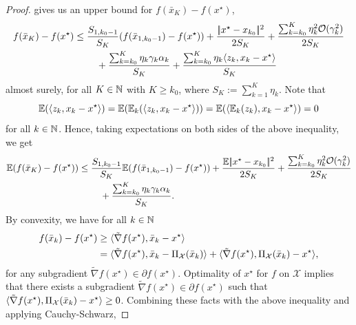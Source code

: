 \begin{proof}
     gives us
    an upper bound for $f(\bar{x}_K) - f(x^\star)$,
    \begin{align*}
        f(\bar{x}_K) - f(x^\star)
        &\leq
        \frac{S_{1, k_0-1}}{S_K} (f(\bar{x}_{1, k_0-1}) - f(x^\star))
        + \frac{|\!|x^\star - x_{k_0}|\!|^2}{2S_K}
        + \frac{\sum_{k=k_0}^{K} \eta_k^2\mathcal{O}(\gamma_k^2)}{2 S_K} \notag \\
        &\phantom{===}
            + \frac{\sum_{k=k_0}^K \eta_k\gamma_k\alpha_k}{S_K}
            + \frac{\sum_{k=k_0}^K \eta_k\langle z_k, x_k - x^\star \rangle}{S_K}
    \end{align*}
    almost surely, for all $K\in\mathbb{N}$ with $K \geq k_0$, where $S_K := \sum_{k=1}^K \eta_k$.
    Note that
    \[
        \mathbb{E}(\langle z_k, x_k - x^\star \rangle)
        = \mathbb{E}(\mathbb{E}_k(\langle z_k, x_k - x^\star \rangle))
        = \mathbb{E}(\langle \mathbb{E}_k(z_k), x_k - x^\star \rangle)
        = 0
    \]
    for all $k\in\mathbb{N}$. Hence, taking expectations on both sides of the above inequality, we get
    \begin{align}
        \label{eq:proof:cor:convergence-rates-in-expectation-convex-case-0}
        \mathbb{E}(f(\bar{x}_K) - f(x^\star))
        &\leq
        \frac{S_{1, k_0-1}}{S_K} \mathbb{E}(f(\bar{x}_{1, k_0-1}) - f(x^\star))
        + \frac{\mathbb{E}|\!|x^\star - x_{k_0}|\!|^2}{2S_K}
        + \frac{\sum_{k=k_0}^{K} \eta_k^2\mathcal{O}(\gamma_k^2)}{2 S_K} \notag \\
        &\phantom{===}
            + \frac{\sum_{k=k_0}^K \eta_k\gamma_k\alpha_k}{S_K}.
    \end{align}
    By convexity, we have for all $k\in\mathbb{N}$
    \begin{align*}
        f(\bar{x}_k) - f(x^\star) &\geq \langle \tilde{\nabla} f(x^\star), \bar{x}_k - x^\star \rangle \\
                            &= \langle \tilde{\nabla} f(x^\star), \bar{x}_k - \operatorname{\Pi_\mathcal{X}}(\bar{x}_k) \rangle
                                + \langle \tilde{\nabla} f(x^\star), \operatorname{\Pi_\mathcal{X}}(\bar{x}_k) - x^\star \rangle,
    \end{align*}
    for any subgradient $\tilde{\nabla} f(x^\star) \in \partial f(x^\star)$. Optimality of $x^\star$
    for $f$ on $\mathcal{X}$ implies that there exists a subgradient
    $\tilde{\nabla} f(x^\star) \in \partial f(x^\star)$ such that
    $\langle \tilde{\nabla} f(x^\star), \operatorname{\Pi_\mathcal{X}}(\bar{x}_k) - x^\star \rangle \geq 0$.
    Combining these facts with the above inequality and applying Cauchy-Schwarz,

\end{proof}
